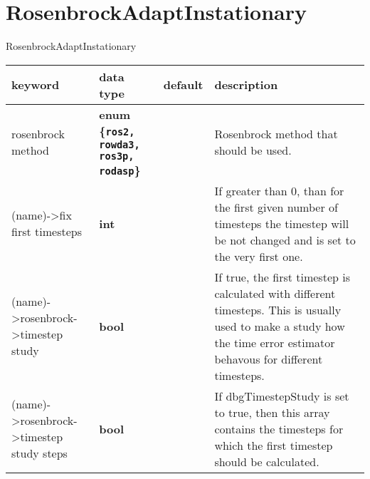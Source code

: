\documentclass[10pt,a4paper]{article}
\newcommand{\basis}{{(name)->}}
\begin{document}
\section*{RosenbrockAdaptInstationary}
RosenbrockAdaptInstationary
{
\small
\begin{longtable}[l]{|>{\ttfamily}lp{}>{\ttfamily}lp{}|}
\hline
\textrm{\textbf{keyword}} & \textrm{\textbf{data type}} & \textrm{\textbf{default}} & \textrm{\textbf{description}} \\
\hline\hline

\hline\basis rosenbrock method & \textbf{enum \{\texttt{ros2, rowda3, ros3p, rodasp}\}} & [] & Rosenbrock method that should be used.\\ \hline
\basis fix first timesteps & \textbf{int} & [0] & If greater than 0, than for the first given number of timesteps the timestep will be not changed and is set to the very first one.\\ \hline
\basis rosenbrock->timestep study & \textbf{bool} & [0] & If true, the first timestep is calculated with different timesteps. This is usually used to make a study how the time error estimator behavous for different timesteps.\\ \hline
\basis rosenbrock->timestep study steps & \textbf{bool} & [0] & If dbgTimestepStudy is set to true, then this array contains the timesteps for which the first timestep should be calculated.\\ \hline
\end{longtable}
}



\end{document}
